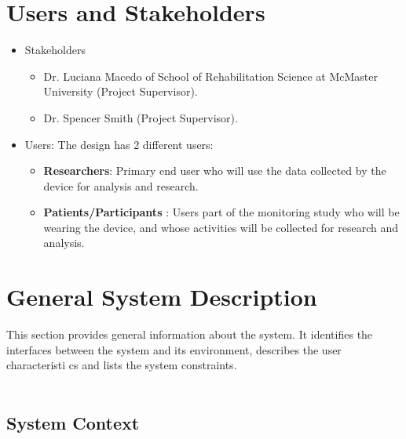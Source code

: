\documentclass[12pt]{article}
\begin{document}
\section{Users and Stakeholders}
\begin{itemize}
\item Stakeholders

	\begin{itemize}
		\item  Dr. Luciana Macedo of School of Rehabilitation Science at McMaster University (Project Supervisor).
		\item  Dr. Spencer Smith (Project Supervisor).
	\end{itemize}

\item Users: The design has 2 different users:
	\begin{itemize}
		\item \textbf{Researchers}: Primary end user who will use the data collected by the device for analysis and research.
		\item \textbf{Patients/Participants} : Users part of the monitoring study who will be wearing the device, and whose activities will be collected for research and analysis.
	\end{itemize}
\end{itemize}

\section{General System Description}

This section provides general information about the system.  It identifies the
interfaces between the system and its environment, describes the user
characteristi	cs and lists the system constraints.  \\\\
\subsection{System Context}
\end{document}
